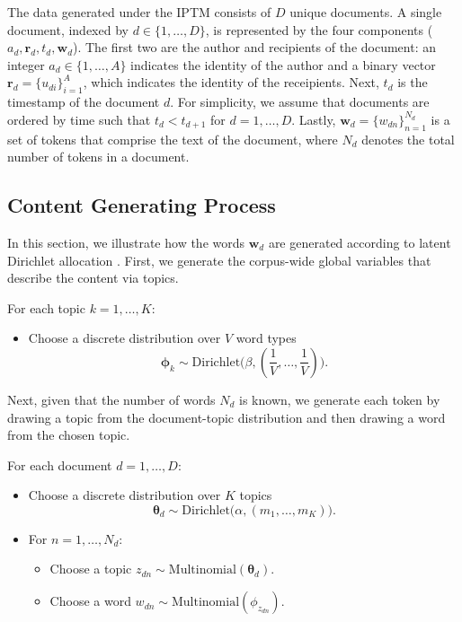 \documentclass{article}
\begin{document}
The data generated under the IPTM consists of $D$ unique documents. A single document, indexed by $d \in \{1,\ldots,D\}$, is represented by the four components ($a_d, \boldsymbol{r}_d, t_d,  \boldsymbol{w}_d$). The first two are the author and recipients of the document: an integer $a_d \in \{1,\ldots,A\}$ indicates the identity of the author and a binary vector $\boldsymbol{r}_d = \{u_{di} \}_{i=1}^{A}$, which indicates the identity of the receipients. Next, $t_d$ is the timestamp of the document $d$. For simplicity, we assume that documents are ordered by time such that $t_d < t_{d+1}$ for $d=1, \ldots, D$. Lastly, $ \boldsymbol{w}_d= \{w_{dn} \}_{n=1}^{N_d}$ is a set of tokens that comprise the text of the document, where $N_d$ denotes the total number of tokens in a document.


\subsection{Content Generating Process}\label{subsec:Content generating process}

In this section, we illustrate how the words $\boldsymbol{w}_d$ are generated according to latent Dirichlet allocation \cite{Blei2003}. First, we generate the corpus-wide global variables that describe the content via topics. 

For each topic $k=1,\ldots,K$:
\begin{itemize}
	\item Choose a discrete distribution over $V$ word types $$\boldsymbol{\phi}_k \sim \mbox{Dirichlet}\Big(\beta, (\frac{1}{V},\ldots,\frac{1}{V})\Big).$$
\end{itemize}
Next, given that the number of words $N_d$ is known, we generate each token by drawing a topic from the document-topic distribution and then drawing a word from the chosen topic. 

For each document $d=1,\ldots,D$:
\begin{itemize}
	\item Choose a discrete distribution over $K$ topics
	$$\boldsymbol{\theta}_d \sim \mbox{Dirichlet}\Big(\alpha, (m_1,\ldots,m_K)\Big).$$
	\item For $n=1,\ldots,N_d$:
	\begin{itemize}
		\item Choose a topic $z_{dn} \sim \mbox{Multinomial}(\boldsymbol{\theta}_d).$
		\item Choose a word $w_{dn} \sim\mbox{Multinomial} (\phi_{z_{dn}}).$
	\end{itemize}
\end{itemize}
\end{document}

